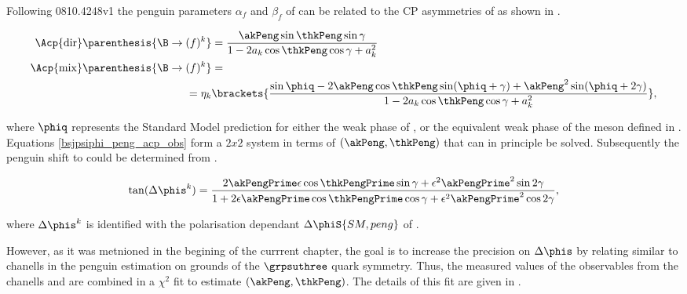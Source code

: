 Following {\color{red} 0810.4248v1} the penguin parameters $\alpha_f$ and $\beta_f$ of 
can be related to the CP asymmetries of  as shown in .

\begin{subequations}
  \label{bsjpsiphi_peng_acp_obs}
\begin{align}
  \Acp{\rm dir}\parenthesis{\B\to (f)^k} &= \frac{ \akPeng \sin\thkPeng \sin\gamma} {1 - 2 a_k \cos\thkPeng \cos\gamma + a_k^{2}}
  \label{bsjpsiphi_peng_acp_dir} \\
  \Acp{\rm mix}\parenthesis{\B\to (f)^k} &= \nonumber \\
   = \eta_k & \brackets{\frac{\sin\phiq - 2\akPeng \cos\thkPeng\sin(\phiq+\gamma) + \akPeng^2 \sin(\phiq+2\gamma)}
                                                                 {1 - 2 a_k \cos\thkPeng \cos\gamma + a_k^{2}} },
  \label{bsjpsiphi_peng_acp_mix}
\end{align}
\end{subequations}

\noindent where $\phiq$ represents the Standard Model prediction for either the weak phase \phis of ,
or the equivalent weak phase \phid of the \Bd meson defined in .
Equations \ref{bsjpsiphi_peng_acp_obs} form a $2x2$ system in terms of $(\akPeng,\thkPeng)$ that can in principle be solved.
Subsequently the penguin shift to \phis could be determined from .

\begin{equation}
\centering
\tan(\Delta\phis^k) = \frac{ 2\akPengPrime\epsilon\cos\thkPengPrime \sin\gamma + \epsilon^2\akPengPrime^2 \sin2\gamma}
                             {1 + 2\epsilon\akPengPrime \cos\thkPengPrime \cos\gamma + \epsilon^2\akPengPrime^2 \cos2\gamma},
\label{tandelta}
\end{equation}

\noindent where $\Delta\phis^k$ is identified with the polarisation dependant $\Delta\phiS{SM, peng}$ of .

However, as it was metnioned in the begining of the currrent chapter, the goal is to increase the precision on $\Delta{\phis}$
by relating similar to \BsJpsiPhi chanells in the penguin estimation on grounds of the $\grpsuthree$ quark symmetry.
Thus, the measured values of the observables  from the chanells \BsJpsiKst and \BdJpsiRho
are combined in a $\chi^2$ fit to estimate $(\akPeng,\thkPeng)$. The details of this fit are given in .


